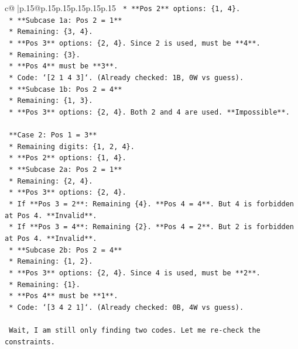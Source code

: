 \documentclass{article}
\begin{document}
{\begin{supertabular}{c@{$\;$}|p{.15\linewidth}@{}p{.15\linewidth}p{.15\linewidth}p{.15\linewidth}p{.15\linewidth}p{.15\linewidth}}
{{{\texttt{    *   **Pos 2** options: \{1, 4\}.} \\
\texttt{        *   **Subcase 1a: Pos 2 = 1**} \\
\texttt{            *   Remaining: \{3, 4\}.} \\
\texttt{            *   **Pos 3** options: \{2, 4\}. Since 2 is used, must be **4**.} \\
\texttt{            *   Remaining: \{3\}.} \\
\texttt{            *   **Pos 4** must be **3**.} \\
\texttt{            *   Code: `{[}2 1 4 3{]}`. (Already checked: 1B, 0W vs guess).} \\
\texttt{        *   **Subcase 1b: Pos 2 = 4**} \\
\texttt{            *   Remaining: \{1, 3\}.} \\
\texttt{            *   **Pos 3** options: \{2, 4\}. Both 2 and 4 are used. **Impossible**.} \\
\\ 
\texttt{    **Case 2: Pos 1 = 3**} \\
\texttt{    *   Remaining digits: \{1, 2, 4\}.} \\
\texttt{    *   **Pos 2** options: \{1, 4\}.} \\
\texttt{        *   **Subcase 2a: Pos 2 = 1**} \\
\texttt{            *   Remaining: \{2, 4\}.} \\
\texttt{            *   **Pos 3** options: \{2, 4\}.} \\
\texttt{                *   If **Pos 3 = 2**: Remaining \{4\}. **Pos 4 = 4**. But 4 is forbidden at Pos 4. **Invalid**.} \\
\texttt{                *   If **Pos 3 = 4**: Remaining \{2\}. **Pos 4 = 2**. But 2 is forbidden at Pos 4. **Invalid**.} \\
\texttt{        *   **Subcase 2b: Pos 2 = 4**} \\
\texttt{            *   Remaining: \{1, 2\}.} \\
\texttt{            *   **Pos 3** options: \{2, 4\}. Since 4 is used, must be **2**.} \\
\texttt{            *   Remaining: \{1\}.} \\
\texttt{            *   **Pos 4** must be **1**.} \\
\texttt{            *   Code: `{[}3 4 2 1{]}`. (Already checked: 0B, 4W vs guess).} \\
\\ 
\texttt{    Wait, I am still only finding two codes. Let me re{-}check the constraints.} \\
}}}
\end{supertabular}}
\end{document}
